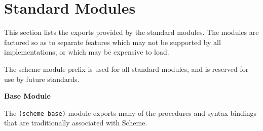 \chapter{Standard Modules}
\label{stdmodules}

This section lists the exports provided by the standard modules.  The
modules are factored so as to separate features which may not be
supported by all implementations, or which may be expensive to load.

The {\cf scheme} module prefix is used for all standard modules, and
is reserved for use by future standards.

\textbf{Base Module}

The \texttt{(scheme base)} module exports many of the procedures and
syntax bindings that are traditionally associated with Scheme.


